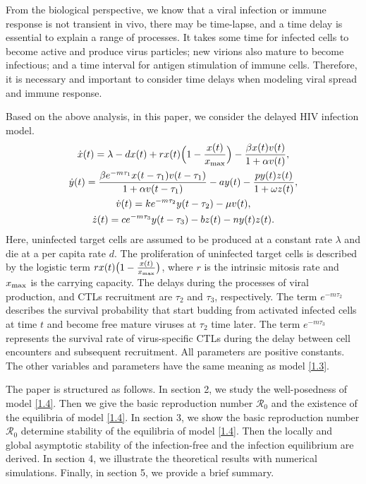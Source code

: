\documentclass[reqno]{amsart}
\begin{document}
From the biological perspective, we know that a viral infection or immune 
response is not transient in vivo, there may be time-lapse, and
a time delay is essential to explain a range of processes. 
It takes some time for infected cells to become active and produce virus particles; 
new virions also mature to become  infectious; and a time interval for antigen 
stimulation of immune cells. Therefore, it is necessary and important to consider time 
delays when modeling viral spread and  immune response.

 Based on the above analysis, in this paper, we consider the  
  delayed HIV infection model.
\begin{equation}\label{1.4}
\begin{gathered}
\dot{x}(t)=\lambda-dx(t)+rx(t)\Big(1-{\frac{x(t)}{x_{\rm max}}}\Big)-{\frac{\beta x(t)v(t)}{1+\alpha v(t)}},\\
\dot{y}(t)={\frac{\beta e^{-m\tau_1}x(t-\tau_1)v(t-\tau_1)}{1+\alpha v(t-\tau_1)}}-ay(t)-{\frac{py(t)z(t)}{1+\omega z(t)}},\\
\dot{v}(t)=k e^{-m\tau_2}y(t-\tau_2)-\mu v(t),\\
\dot{z}(t)=ce^{-m\tau_3}y(t-\tau_3)-bz(t)-ny(t)z(t).
\end{gathered}
\end{equation}
Here, uninfected target cells are assumed to be produced at a constant rate $\lambda$ 
and die at a per capita rate $d$. The proliferation of uninfected target cells is 
described by the logistic term $rx(t)\big(1-\frac{x(t)}{x_{\rm max}}\big)$, where
$r$ is the intrinsic mitosis rate and $x_{\rm max}$ is the carrying capacity. 
The delays during the processes of  viral production, and CTLs recruitment are $\tau_2$ 
and $\tau_3$, respectively. The term $ e^{-m\tau_2}$ describes the survival probability 
that start budding from activated infected cells at time $t$ and become free mature 
viruses at $\tau_2$ time later. The term $ e^{-m\tau_3}$ represents the survival rate 
of virus-specific CTLs during the delay
between cell encounters and subsequent recruitment. 
All parameters are positive constants. The other variables and parameters have the 
same meaning as model \eqref{1.3}.

The paper is structured as follows. 
In section 2, we study the well-posedness of model \eqref{1.4}. Then we give the 
basic reproduction number $\mathcal{R}_0$ and
the existence of the equilibria of  model \eqref{1.4}. 
In section 3, we show the basic reproduction number $\mathcal{R}_0$ determine
stability of the equilibria of model \eqref{1.4}. Then the locally  and global
asymptotic stability of the infection-free and the infection equilibrium
are derived.
In section 4, we illustrate the theoretical results with numerical simulations. 
Finally, in section 5, we provide a brief summary.
\end{document}
